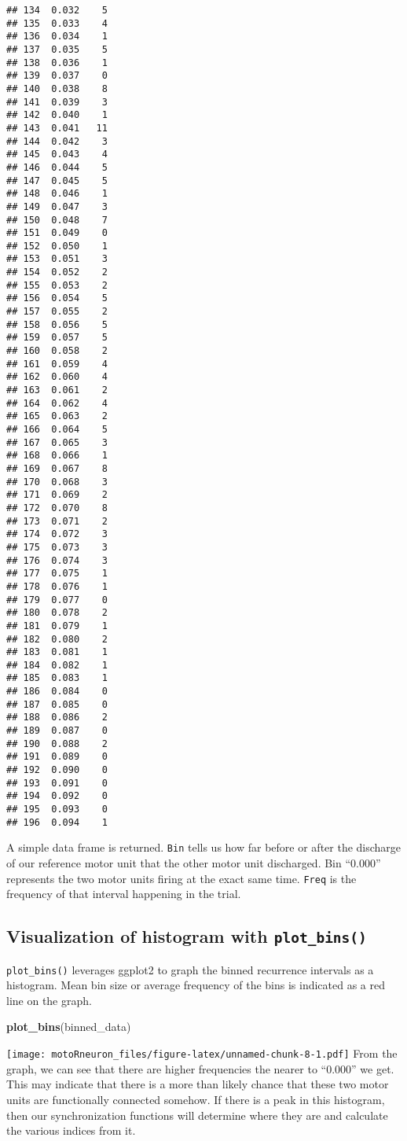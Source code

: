 \documentclass[]{article}
\newenvironment{Shaded}{\begin{snugshade}}{\end{snugshade}}
\newcommand{\KeywordTok}[1]{\textcolor[rgb]{0.13,0.29,0.53}{\textbf{#1}}}
\newcommand{\NormalTok}[1]{#1}
\begin{document}
\begin{verbatim}
## 134  0.032    5
## 135  0.033    4
## 136  0.034    1
## 137  0.035    5
## 138  0.036    1
## 139  0.037    0
## 140  0.038    8
## 141  0.039    3
## 142  0.040    1
## 143  0.041   11
## 144  0.042    3
## 145  0.043    4
## 146  0.044    5
## 147  0.045    5
## 148  0.046    1
## 149  0.047    3
## 150  0.048    7
## 151  0.049    0
## 152  0.050    1
## 153  0.051    3
## 154  0.052    2
## 155  0.053    2
## 156  0.054    5
## 157  0.055    2
## 158  0.056    5
## 159  0.057    5
## 160  0.058    2
## 161  0.059    4
## 162  0.060    4
## 163  0.061    2
## 164  0.062    4
## 165  0.063    2
## 166  0.064    5
## 167  0.065    3
## 168  0.066    1
## 169  0.067    8
## 170  0.068    3
## 171  0.069    2
## 172  0.070    8
## 173  0.071    2
## 174  0.072    3
## 175  0.073    3
## 176  0.074    3
## 177  0.075    1
## 178  0.076    1
## 179  0.077    0
## 180  0.078    2
## 181  0.079    1
## 182  0.080    2
## 183  0.081    1
## 184  0.082    1
## 185  0.083    1
## 186  0.084    0
## 187  0.085    0
## 188  0.086    2
## 189  0.087    0
## 190  0.088    2
## 191  0.089    0
## 192  0.090    0
## 193  0.091    0
## 194  0.092    0
## 195  0.093    0
## 196  0.094    1
\end{verbatim}

A simple data frame is returned. \texttt{Bin} tells us how far before or
after the discharge of our reference motor unit that the other motor
unit discharged. Bin ``0.000'' represents the two motor units firing at
the exact same time. \texttt{Freq} is the frequency of that interval
happening in the trial.

\subsection{\texorpdfstring{Visualization of histogram with
\texttt{plot\_bins()}}{Visualization of histogram with plot\_bins()}}\label{visualization-of-histogram-with-plot_bins}

\texttt{plot\_bins()} leverages ggplot2 to graph the binned recurrence
intervals as a histogram. Mean bin size or average frequency of the bins
is indicated as a red line on the graph.

\begin{Shaded}
\begin{Highlighting}[]
\KeywordTok{plot_bins}\NormalTok{(binned_data)}
\end{Highlighting}
\end{Shaded}

\texttt{[image: motoRneuron\_files/figure-latex/unnamed-chunk-8-1.pdf]}
From the graph, we can see that there are higher frequencies the nearer
to ``0.000'' we get. This may indicate that there is a more than likely
chance that these two motor units are functionally connected somehow. If
there is a peak in this histogram, then our synchronization functions
will determine where they are and calculate the various indices from it.
\end{document}
